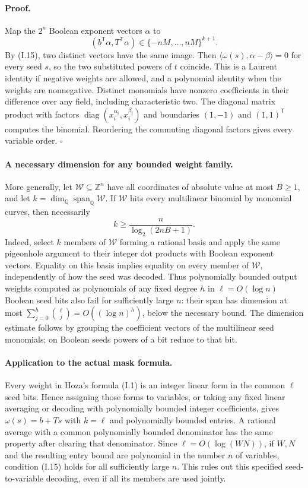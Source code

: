 \paragraph{Proof.}
Map the $2^n$ Boolean exponent vectors $\alpha$ to
\[
 \left(b^{\mathsf T}\alpha,T^{\mathsf T}\alpha\right)\in
 \{-nM,\ldots,nM\}^{k+1}.
\]
By (I.15), two distinct vectors have the same image.  Then
$\langle\omega(s),\alpha-\beta\rangle=0$ for every seed $s$,
so the two substituted powers of $t$ coincide.  This is a Laurent
identity if negative weights are allowed, and a polynomial identity
when the weights are nonnegative.  Distinct monomials have nonzero
coefficients in their difference over any field, including
characteristic two.  The diagonal matrix product with factors
$\operatorname{diag}(x_i^{\alpha_i},x_i^{\beta_i})$ and boundaries
$(1,-1)$ and $(1,1)^{\mathsf T}$ computes the binomial.  Reordering
the commuting diagonal factors gives every variable order.
\hfill$\square$

\paragraph{A necessary dimension for any bounded weight family.}
More generally, let $\mathcal W\subseteq\mathbb Z^n$ have all
coordinates of absolute value at most $B\ge1$, and let
$k=\dim_{\mathbb Q}\operatorname{span}_{\mathbb Q}\mathcal W$.
If $\mathcal W$ hits every multilinear binomial by monomial curves,
then necessarily
\[
 k\ge\frac{n}{\log_2(2nB+1)}.
\]
Indeed, select $k$ members of $\mathcal W$ forming a rational basis
and apply the same pigeonhole argument to their integer dot products
with Boolean exponent vectors.  Equality on this basis implies
equality on every member of $\mathcal W$, independently of how
the seed was decoded.  Thus polynomially bounded output weights
computed as polynomials of any fixed degree $h$ in
$\ell=O(\log n)$ Boolean seed bits also fail for sufficiently large
$n$: their span has dimension at most
$\sum_{j=0}^h\binom{\ell}{j}=O((\log n)^h)$, below the necessary
bound.  The dimension estimate follows by grouping the coefficient
vectors of the multilinear seed monomials; on Boolean seeds powers
of a bit reduce to that bit.

\paragraph{Application to the actual mask formula.}
Every weight in Hoza's formula (I.1) is an integer linear form in
the common $\ell$ seed bits.  Hence assigning those forms to
variables, or taking any fixed linear averaging or decoding with
polynomially bounded integer coefficients, gives $\omega(s)=b+Ts$
with $k=\ell$ and polynomially bounded entries.  A rational average
with a common polynomially bounded denominator has the same property
after clearing that denominator.  Since $\ell=O(\log(WN))$, if
$W,N$ and the resulting entry bound are polynomial in the number
$n$ of variables, condition (I.15) holds for all sufficiently large
$n$.  This rules out this specified seed-to-variable decoding,
even if all its members are used jointly.

